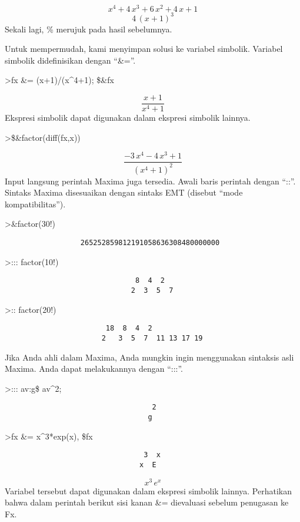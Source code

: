 \documentclass[
]{book}
\begin{document}
\[x^4+4\,x^3+6\,x^2+4\,x+1\] \[4\,\left(x+1\right)^3\]Sekali lagi, \% merujuk pada hasil sebelumnya.

Untuk mempermudah, kami menyimpan solusi ke variabel simbolik. Variabel simbolik didefinisikan dengan ``\&=''.

\textgreater fx \&= (x+1)/(x\^{}4+1); \$\&fx

\[\frac{x+1}{x^4+1}\]Ekspresi simbolik dapat digunakan dalam ekspresi simbolik lainnya.

\textgreater\$\&factor(diff(fx,x))

\[\frac{-3\,x^4-4\,x^3+1}{\left(x^4+1\right)^2}\]Input langsung perintah Maxima juga tersedia. Awali baris perintah dengan ``::''. Sintaks Maxima disesuaikan dengan sintaks EMT (disebut ``mode kompatibilitas'').

\textgreater\&factor(30!)

\begin{verbatim}
                  265252859812191058636308480000000
\end{verbatim}

\textgreater::: factor(10!)

\begin{verbatim}
                               8  4  2
                              2  3  5  7
\end{verbatim}

\textgreater:: factor(20!)

\begin{verbatim}
                        18  8  4  2
                       2   3  5  7  11 13 17 19
\end{verbatim}

Jika Anda ahli dalam Maxima, Anda mungkin ingin menggunakan sintaksis asli Maxima. Anda dapat melakukannya dengan ``:::''.

\textgreater::: av:g\$ av\^{}2;

\begin{verbatim}
                                   2
                                  g
\end{verbatim}

\textgreater fx \&= x\^{}3*exp(x), \$fx

\begin{verbatim}
                                 3  x
                                x  E
\end{verbatim}

\[x^3\,e^{x}\]Variabel tersebut dapat digunakan dalam ekspresi simbolik lainnya. Perhatikan bahwa dalam perintah berikut sisi kanan \&= dievaluasi sebelum penugasan ke Fx.
\end{document}
